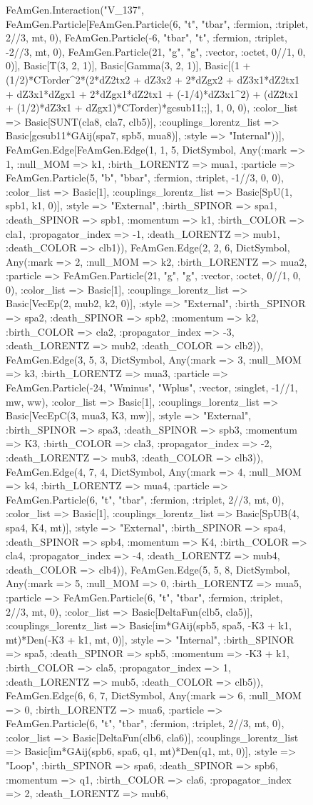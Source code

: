\documentclass{revtex4}
\begin{document}
\begin{figure}[!htb]
\begin{center}
{FeAmGen.Interaction("V_137", FeAmGen.Particle[FeAmGen.Particle(6, "t", "tbar", :fermion, :triplet, 2//3, mt, 0), FeAmGen.Particle(-6, "tbar", "t", :fermion, :triplet, -2//3, mt, 0), FeAmGen.Particle(21, "g", "g", :vector, :octet, 0//1, 0, 0)], Basic[T(3, 2, 1)], Basic[Gamma(3, 2, 1)], Basic[(1 + (1/2)*CTorder^2*(2*dZ2tx2 + dZ3x2 + 2*dZgx2 + dZ3x1*dZ2tx1 + dZ3x1*dZgx1 + 2*dZgx1*dZ2tx1 + (-1/4)*dZ3x1^2) + (dZ2tx1 + (1/2)*dZ3x1 + dZgx1)*CTorder)*gcsub11;;], 1, 0, 0), :color_list => Basic[SUNT(cla8, cla7, clb5)], :couplings_lorentz_list => Basic[gcsub11*GAij(spa7, spb5, mua8)], :style => "Internal"))], FeAmGen.Edge[FeAmGen.Edge(1, 1, 5, Dict{Symbol, Any}(:mark => 1, :null_MOM => k1, :birth_LORENTZ => mua1, :particle => FeAmGen.Particle(5, "b", "bbar", :fermion, :triplet, -1//3, 0, 0), :color_list => Basic[1], :couplings_lorentz_list => Basic[SpU(1, spb1, k1, 0)], :style => "External", :birth_SPINOR => spa1, :death_SPINOR => spb1, :momentum => k1, :birth_COLOR => cla1, :propagator_index => -1, :death_LORENTZ => mub1, :death_COLOR => clb1)), FeAmGen.Edge(2, 2, 6, Dict{Symbol, Any}(:mark => 2, :null_MOM => k2, :birth_LORENTZ => mua2, :particle => FeAmGen.Particle(21, "g", "g", :vector, :octet, 0//1, 0, 0), :color_list => Basic[1], :couplings_lorentz_list => Basic[VecEp(2, mub2, k2, 0)], :style => "External", :birth_SPINOR => spa2, :death_SPINOR => spb2, :momentum => k2, :birth_COLOR => cla2, :propagator_index => -3, :death_LORENTZ => mub2, :death_COLOR => clb2)), FeAmGen.Edge(3, 5, 3, Dict{Symbol, Any}(:mark => 3, :null_MOM => k3, :birth_LORENTZ => mua3, :particle => FeAmGen.Particle(-24, "Wminus", "Wplus", :vector, :singlet, -1//1, mw, ww), :color_list => Basic[1], :couplings_lorentz_list => Basic[VecEpC(3, mua3, K3, mw)], :style => "External", :birth_SPINOR => spa3, :death_SPINOR => spb3, :momentum => K3, :birth_COLOR => cla3, :propagator_index => -2, :death_LORENTZ => mub3, :death_COLOR => clb3)), FeAmGen.Edge(4, 7, 4, Dict{Symbol, Any}(:mark => 4, :null_MOM => k4, :birth_LORENTZ => mua4, :particle => FeAmGen.Particle(6, "t", "tbar", :fermion, :triplet, 2//3, mt, 0), :color_list => Basic[1], :couplings_lorentz_list => Basic[SpUB(4, spa4, K4, mt)], :style => "External", :birth_SPINOR => spa4, :death_SPINOR => spb4, :momentum => K4, :birth_COLOR => cla4, :propagator_index => -4, :death_LORENTZ => mub4, :death_COLOR => clb4)), FeAmGen.Edge(5, 5, 8, Dict{Symbol, Any}(:mark => 5, :null_MOM => 0, :birth_LORENTZ => mua5, :particle => FeAmGen.Particle(6, "t", "tbar", :fermion, :triplet, 2//3, mt, 0), :color_list => Basic[DeltaFun(clb5, cla5)], :couplings_lorentz_list => Basic[im*GAij(spb5, spa5, -K3 + k1, mt)*Den(-K3 + k1, mt, 0)], :style => "Internal", :birth_SPINOR => spa5, :death_SPINOR => spb5, :momentum => -K3 + k1, :birth_COLOR => cla5, :propagator_index => 1, :death_LORENTZ => mub5, :death_COLOR => clb5)), FeAmGen.Edge(6, 6, 7, Dict{Symbol, Any}(:mark => 6, :null_MOM => 0, :birth_LORENTZ => mua6, :particle => FeAmGen.Particle(6, "t", "tbar", :fermion, :triplet, 2//3, mt, 0), :color_list => Basic[DeltaFun(clb6, cla6)], :couplings_lorentz_list => Basic[im*GAij(spb6, spa6, q1, mt)*Den(q1, mt, 0)], :style => "Loop", :birth_SPINOR => spa6, :death_SPINOR => spb6, :momentum => q1, :birth_COLOR => cla6, :propagator_index => 2, :death_LORENTZ => mub6, }
\end{center}
\end{figure}
\end{document}
